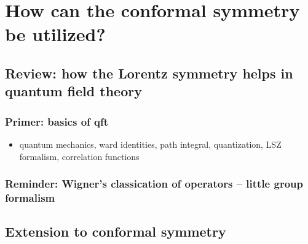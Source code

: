 \documentclass[12pt]{article}
\numberwithin{equation}{section}
\begin{document}
\section{How can the conformal symmetry be utilized?}
\subsection{Review: how the Lorentz symmetry helps in quantum field theory}
\subsubsection{Primer: basics of qft}
\begin{itemize}
	\item quantum mechanics, ward identities, path integral, quantization,
	LSZ formalism, correlation functions
\end{itemize}
\subsubsection{Reminder: Wigner's classication of operators -- little group formalism}
\subsection{Extension to conformal symmetry}


{}

\end{document}
